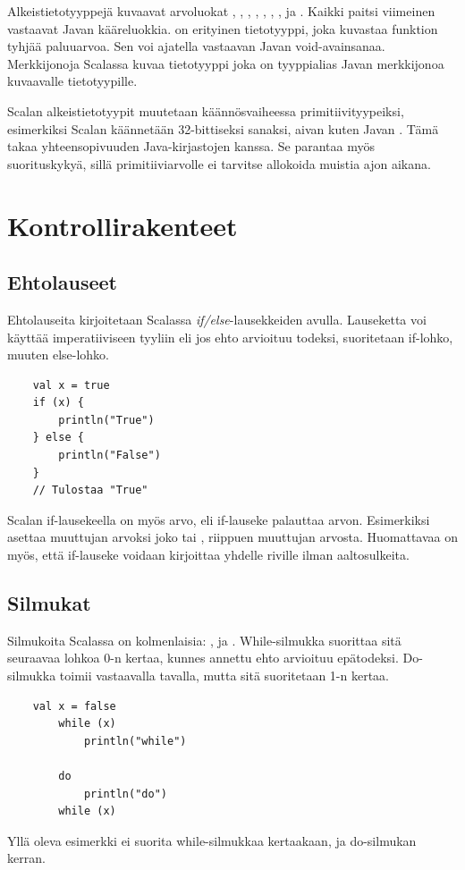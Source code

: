 Alkeistietotyyppejä kuvaavat arvoluokat , , , , , , ,  ja . Kaikki paitsi viimeinen vastaavat Javan kääreluokkia.  on erityinen tietotyyppi, joka kuvastaa funktion tyhjää paluuarvoa. Sen voi ajatella vastaavan Javan void-avainsanaa. Merkkijonoja Scalassa kuvaa tietotyyppi  joka on tyyppialias Javan merkkijonoa kuvaavalle tietotyypille.
\cite[Luku 5]{prorgrammingInScala3rd}

Scalan alkeistietotyypit muutetaan käännösvaiheessa primitiivityypeiksi, esimerkiksi Scalan  käännetään 32-bittiseksi sanaksi, aivan kuten Javan . Tämä takaa yhteensopivuuden Java-kirjastojen kanssa. Se parantaa myös suorituskykyä, sillä primitiiviarvolle ei tarvitse allokoida muistia ajon aikana.
\cite[Luku 6]{prorgrammingInScala3rd}


\section{Kontrollirakenteet}

\subsection{Ehtolauseet}
Ehtolauseita kirjoitetaan Scalassa \textit{if/else}-lausekkeiden avulla. Lauseketta voi käyttää imperatiiviseen tyyliin eli jos ehto arvioituu todeksi, suoritetaan if-lohko, muuten else-lohko.
\begin{lstlisting}
    val x = true
    if (x) {
        println("True")
    } else {
        println("False")
    }
    // Tulostaa "True"
\end{lstlisting}
Scalan if-lausekeella on myös arvo, eli if-lauseke palauttaa arvon. Esimerkiksi \newline {} asettaa muuttujan  arvoksi joko  tai , riippuen muuttujan  arvosta. Huomattavaa on myös, että if-lauseke voidaan kirjoittaa yhdelle riville ilman aaltosulkeita.
\cite[Luku 2.1]{scalaForTheImpatient}
        
\subsection{Silmukat}
Silmukoita Scalassa on kolmenlaisia: ,  ja . While-silmukka suorittaa sitä seuraavaa lohkoa 0-n kertaa, kunnes annettu ehto arvioituu epätodeksi. Do-silmukka toimii vastaavalla tavalla, mutta sitä suoritetaan 1-n kertaa.
\begin{lstlisting}
    val x = false
		while (x)
			println("while")
		
		do
			println("do")
        while (x)
\end{lstlisting}
Yllä oleva esimerkki ei suorita while-silmukkaa kertaakaan, ja do-silmukan kerran.
\cite[Luku 2.5]{scalaForTheImpatient}

